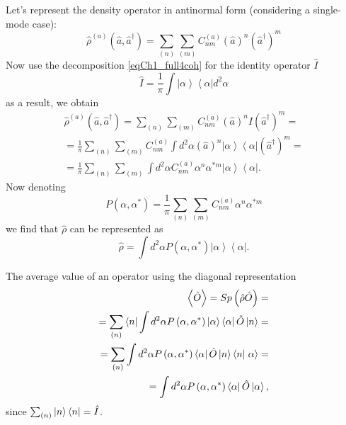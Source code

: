 Let's represent the density operator in antinormal form (considering a single-mode case): 
\begin{equation}
\hat{\rho}^{\left(a\right)}\left(\hat{a},\hat{a}^{\dag}\right) = 
\sum_{(n)}\sum_{(m)}C^{\left(a\right)}_{nm}\left(\hat{a}\right)^n\left(\hat{a}^{\dag}\right)^m
\end{equation}
Now use the decomposition \eqref{eqCh1_full4coh} for the identity operator $\hat{I}$
\[
\hat{I} = \frac{1}{\pi}\int \left|\alpha\right>\left<\alpha\right| d^2 \alpha
\]
as a result, we obtain
\begin{eqnarray}
\hat{\rho}^{\left(a\right)}\left(\hat{a},\hat{a}^{\dag}\right) = 
\sum_{(n)}\sum_{(m)}C^{\left(a\right)}_{nm}\left(\hat{a}\right)^n\hat{I}\left(\hat{a}^{\dag}\right)^m
= 
\nonumber \\
= \frac{1}{\pi}\sum_{(n)}\sum_{(m)}C^{\left(a\right)}_{nm}\int d^2 \alpha
\left(\hat{a}\right)^n
\left|\alpha\right>\left<\alpha\right|
\left(\hat{a}^{\dag}\right)^m = 
\nonumber \\
= \frac{1}{\pi}\sum_{(n)}\sum_{(m)}\int d^2 \alpha
C^{\left(a\right)}_{nm}
\alpha^n
\alpha^{*m}
\left|\alpha\right>\left<\alpha\right|.
\end{eqnarray}
Now denoting 
\[
P\left(\alpha, \alpha^{*}\right) = \frac{1}{\pi}\sum_{(n)}\sum_{(m)}
C^{\left(a\right)}_{nm}
\alpha^n
\alpha^{*m}
\]
we find that $\hat{\rho}$ can be represented as
\begin{equation}
\hat{\rho} = \int d^2 \alpha P\left(\alpha, \alpha^{*}\right) 
\left|\alpha\right>\left<\alpha\right|.
\label{eqCh1_Rho_in_alpha}
\end{equation}

The average value of an operator using the diagonal representation 
\begin{eqnarray}
\left<\hat{O}\right> = Sp \left(\hat{\rho}\hat{O}\right) =
\nonumber \\
= \sum_{(n)}\bra{n}
\int d^2 \alpha P\left(\alpha, \alpha^{*}\right) 
\left|\alpha\right>\left<\alpha\right|
\hat{O}\ket{n} =
\nonumber \\
= \sum_{(n)} \int d^2 \alpha P\left(\alpha, \alpha^{*}\right)
\left<\alpha\right|\hat{O}\ket{n}
\bra{n}\left.\alpha\right> = 
\nonumber \\
=  
\int d^2 \alpha P\left(\alpha, \alpha^{*}\right)
\left<\alpha\right|\hat{O}\left|\alpha\right>,
\label{eqCh1_middleO}
\end{eqnarray}
since $\sum_{(n)}\ket{n}\bra{n} = \hat{I}$. 

